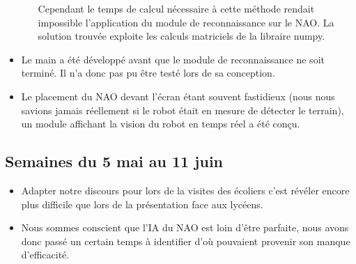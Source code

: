 \begin{itemize}
\begin{itemize}
              Cependant le temps de calcul nécessaire à cette méthode rendait impossible l’application du module de reconnaissance sur le NAO.
              La solution trouvée exploite les calculs matriciels de la libraire numpy.
            \end{itemize}
      \item Le main a été développé avant que le module de reconnaissance ne soit terminé.
      Il n’a donc pas pu être testé lors de sa conception.
      \item Le placement du NAO devant l’écran étant souvent fastidieux (nous nous savions jamais réellement si le robot était en mesure de détecter le terrain),
      un module affichant la vision du robot en temps réel a été conçu.\\
    \end{itemize}

    \subsection{Semaines du 5 mai au 11 juin}
    \label{sub:Semaines du 5 mai au 11 juin}
      \begin{itemize}
        \item Adapter notre discours pour lors de la visites des écoliers c'est révéler encore plus difficile que lors de la présentation face aux lycéens.
        \item Nous sommes conscient que l'IA du NAO est loin d'être parfaite, nous avons donc passé un certain temps à identifier d'où pouvaient provenir son manque d'efficacité.
      \end{itemize}

\pagebreak
